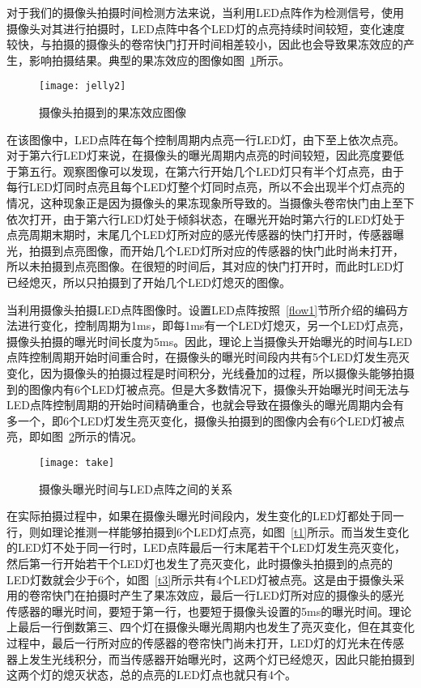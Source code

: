 对于我们的摄像头拍摄时间检测方法来说，当利用LED点阵作为检测信号，使用摄像头对其进行拍摄时，LED点阵中各个LED灯的点亮持续时间较短，变化速度较快，与拍摄的摄像头的卷帘快门打开时间相差较小，因此也会导致果冻效应的产生，影响拍摄结果。典型的果冻效应的图像如图~\ref{jelly2}所示。

\begin{figure}[h] 
  \centering
  \texttt{[image: jelly2]}
  \caption{摄像头拍摄到的果冻效应图像}
  \label{jelly2}
\end{figure}

在该图像中，LED点阵在每个控制周期内点亮一行LED灯，由下至上依次点亮。对于第六行LED灯来说，在摄像头的曝光周期内点亮的时间较短，因此亮度要低于第五行。观察图像可以发现，在第六行开始几个LED灯只有半个灯点亮，由于每行LED灯同时点亮且每个LED灯整个灯同时点亮，所以不会出现半个灯点亮的情况，这种现象正是因为摄像头的果冻现象所导致的。当摄像头卷帘快门由上至下依次打开，由于第六行LED灯处于倾斜状态，在曝光开始时第六行的LED灯处于点亮周期末期时，末尾几个LED灯所对应的感光传感器的快门打开时，传感器曝光，拍摄到点亮图像，而开始几个LED灯所对应的传感器的快门此时尚未打开，所以未拍摄到点亮图像。在很短的时间后，其对应的快门打开时，而此时LED灯已经熄灭，所以只拍摄到了开始几个LED灯熄灭的图像。

当利用摄像头拍摄LED点阵图像时。设置LED点阵按照~\ref{flow1}节所介绍的编码方法进行变化，控制周期为1ms，即每1ms有一个LED灯熄灭，另一个LED灯点亮，摄像头拍摄的曝光时间长度为5ms。因此，理论上当摄像头开始曝光的时间与LED点阵控制周期开始时间重合时，在摄像头的曝光时间段内共有5个LED灯发生亮灭变化，因为摄像头的拍摄过程是时间积分，光线叠加的过程，所以摄像头能够拍摄到的图像内有6个LED灯被点亮。但是大多数情况下，摄像头开始曝光时间无法与LED点阵控制周期的开始时间精确重合，也就会导致在摄像头的曝光周期内会有多一个，即6个LED灯发生亮灭变化，摄像头拍摄到的图像内会有6个LED灯被点亮，即如图~\ref{take}所示的情况。

\begin{figure}[h] 
  \centering
  \texttt{[image: take]}
  \caption{摄像头曝光时间与LED点阵之间的关系}
  \label{take}
\end{figure}

在实际拍摄过程中，如果在摄像头曝光时间段内，发生变化的LED灯都处于同一行，则如理论推测一样能够拍摄到6个LED灯点亮，如图~\ref{t1}所示。而当发生变化的LED灯不处于同一行时，LED点阵最后一行末尾若干个LED灯发生亮灭变化，然后第一行开始若干个LED灯也发生了亮灭变化，此时摄像头拍摄到的点亮的LED灯数就会少于6个，如图~\ref{t3}所示共有4个LED灯被点亮。这是由于摄像头采用的卷帘快门在拍摄时产生了果冻效应，最后一行LED灯所对应的摄像头的感光传感器的曝光时间，要短于第一行，也要短于摄像头设置的5ms的曝光时间。理论上最后一行倒数第三、四个灯在摄像头曝光周期内也发生了亮灭变化，但在其变化过程中，最后一行所对应的传感器的卷帘快门尚未打开，LED灯的灯光未在传感器上发生光线积分，而当传感器开始曝光时，这两个灯已经熄灭，因此只能拍摄到这两个灯的熄灭状态，总的点亮的LED灯点也就只有4个。


